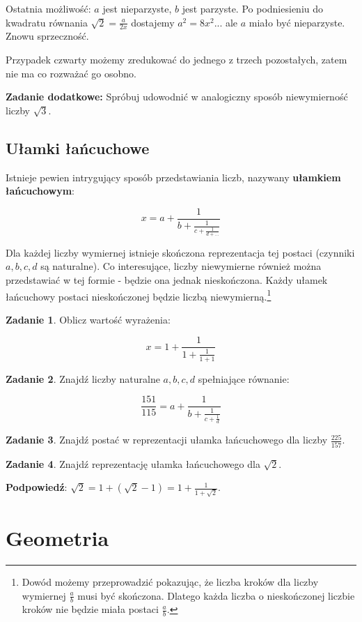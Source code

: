 \documentclass[11pt]{article}
\theoremstyle{definition}
\newtheorem{zad}{Zadanie}
\numberwithin{zad}{section}
\begin{document}
Ostatnia możliwość: $a$ jest nieparzyste, $b$ jest parzyste. Po podniesieniu do kwadratu równania $\sqrt 2 = \frac{a}{2x}$ dostajemy $a^2 = 8x^2$... ale $a$ miało być nieparzyste. Znowu sprzeczność.

Przypadek czwarty możemy zredukować do jednego z trzech pozostałych, zatem nie ma co rozważać go osobno.

\textbf{Zadanie dodatkowe:} Spróbuj udowodnić w analogiczny sposób niewymierność liczby $\sqrt3$.

\subsection{Ułamki łańcuchowe}

Istnieje pewien intrygujący sposób przedstawiania liczb, nazywany \textbf{ułamkiem łańcuchowym}:

$$ x = a + \frac{1}{b+\frac{1}{c+\frac1{d+...}}}$$

Dla każdej liczby wymiernej istnieje skończona reprezentacja tej postaci (czynniki $a,b,c,d$ są naturalne). Co interesujące, liczby niewymierne również można przedstawiać w tej formie - będzie ona jednak nieskończona. Każdy ułamek łańcuchowy postaci nieskończonej będzie liczbą niewymierną.\footnote{Dowód możemy przeprowadzić pokazując, że liczba kroków dla liczby wymiernej $\frac{a}{b}$ musi być skończona. Dlatego każda liczba o nieskończonej liczbie kroków nie będzie miała postaci $\frac ab$.}

\begin{zad}
Oblicz wartość wyrażenia:

$$x = 1+\frac1{1+\frac1{1+1}}$$
\end{zad}

\begin{zad}
Znajdź liczby naturalne $a,b,c,d$ spełniające równanie:

$$\frac{151}{115}=a+\frac1{b+\frac1{c+\frac1d}}$$
\end{zad}
\begin{zad}
Znajdź postać w reprezentacji ułamka łańcuchowego dla liczby $\frac{225}{157}$.
\end{zad}

\begin{zad}
Znajdź reprezentację ułamka łańcuchowego dla $\sqrt{2}$.

\textbf{Podpowiedź}: $\sqrt{2} = 1 + (\sqrt{2}-1) = 1+\frac1{1+\sqrt{2}}$.
\end{zad}
\newpage
\section{Geometria}
\end{document}
